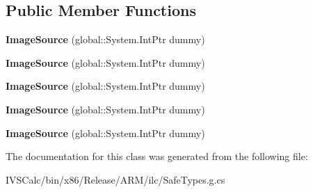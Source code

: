 \subsection*{Public Member Functions}
\begin{DoxyCompactItemize}
\item 
\mbox{\label{class_windows_1_1_u_i_1_1_xaml_1_1_media_1_1_image_source_ac571258d8f799901098f36fbf29f039a}} 
{\bfseries Image\+Source} (global\+::\+System.\+Int\+Ptr dummy)
\item 
\mbox{\label{class_windows_1_1_u_i_1_1_xaml_1_1_media_1_1_image_source_ac571258d8f799901098f36fbf29f039a}} 
{\bfseries Image\+Source} (global\+::\+System.\+Int\+Ptr dummy)
\item 
\mbox{\label{class_windows_1_1_u_i_1_1_xaml_1_1_media_1_1_image_source_ac571258d8f799901098f36fbf29f039a}} 
{\bfseries Image\+Source} (global\+::\+System.\+Int\+Ptr dummy)
\item 
\mbox{\label{class_windows_1_1_u_i_1_1_xaml_1_1_media_1_1_image_source_ac571258d8f799901098f36fbf29f039a}} 
{\bfseries Image\+Source} (global\+::\+System.\+Int\+Ptr dummy)
\item 
\mbox{\label{class_windows_1_1_u_i_1_1_xaml_1_1_media_1_1_image_source_ac571258d8f799901098f36fbf29f039a}} 
{\bfseries Image\+Source} (global\+::\+System.\+Int\+Ptr dummy)
\end{DoxyCompactItemize}


The documentation for this class was generated from the following file\+:\begin{DoxyCompactItemize}
\item 
I\+V\+S\+Calc/bin/x86/\+Release/\+A\+R\+M/ilc/Safe\+Types.\+g.\+cs\end{DoxyCompactItemize}
